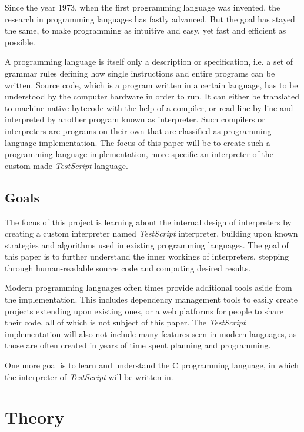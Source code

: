 \documentclass[12pt,a4paper]{article}
\newcommand{\name}{\emph{TestScript}}
\begin{document}
Since the year 1973, when the first programming language was invented, the
research in programming languages has fastly advanced. But the goal has stayed
the same, to make programming as intuitive and easy, yet fast and efficient as
possible.

A programming language is itself only a description or specification, i.e. a
set of grammar rules defining how single instructions and entire programs
can be written. Source code, which is a program written in a certain language,
has to be understood by the computer hardware in order to run. It can either
be translated to machine-native bytecode with the help of a compiler, or
read line-by-line and interpreted by another program known as interpreter.
Such compilers or interpreters are programs on their own that are classified
as programming language implementation. The focus of this paper will be to
create such a programming language implementation, more specific an interpreter
of the custom-made \name{} language.

\subsection{Goals}
The focus of this project is learning about the internal design of interpreters
by creating a custom interpreter named \name{} interpreter, building upon
known strategies and algorithms used in existing programming languages.
The goal of this paper is to further understand the inner workings of
interpreters, stepping through human-readable source code and computing
desired results.

Modern programming languages often times provide additional tools aside from
the implementation. This includes dependency management tools to
easily create projects extending upon existing ones, or a web platforms for
people to share their code, all of which is not subject of this paper.
The \name{} implementation will also not include many features seen in modern
languages, as those are often created in years of time spent planning and
programming.

One more goal is to learn and understand the C programming language, in which
the interpreter of \name{} will be written in.

\section{Theory}
\end{document}
